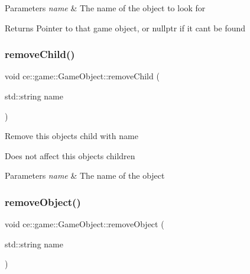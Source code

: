 \begin{DoxyParams}{Parameters}
{\em name} & The name of the object to look for \\
\hline
\end{DoxyParams}
\begin{DoxyReturn}{Returns}
Pointer to that game object, or nullptr if it can\textquotesingle{}t be found 
\end{DoxyReturn}
\mbox{\label{classce_1_1game_1_1_game_object_ab00a9e4dcbadfa208df56e3cbed9e8d2}} 
\subsubsection{\texorpdfstring{remove\+Child()}{removeChild()}}
{\footnotesize\ttfamily void ce\+::game\+::\+Game\+Object\+::remove\+Child (\begin{DoxyParamCaption}\item[{std\+::string}]{name }\end{DoxyParamCaption})}

Remove this objects child with name

Does not affect this objects children


\begin{DoxyParams}{Parameters}
{\em name} & The name of the object \\
\hline
\end{DoxyParams}
\mbox{\label{classce_1_1game_1_1_game_object_ab700981d509605a9b1bef436207e5d54}} 
\subsubsection{\texorpdfstring{remove\+Object()}{removeObject()}}
{\footnotesize\ttfamily void ce\+::game\+::\+Game\+Object\+::remove\+Object (\begin{DoxyParamCaption}\item[{std\+::string}]{name }\end{DoxyParamCaption})}



